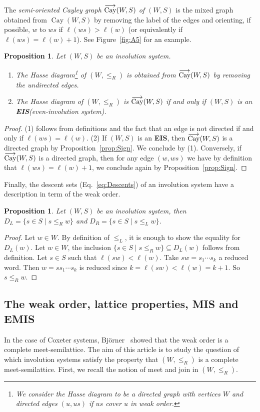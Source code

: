 \documentclass[A4paper, oneside]{amsart}
\newcommand{\Cay}{\operatorname{Cay}}
\newcommand{\oCay}{%
  \operatorname{%
    \overset{\smash{\raisebox{-0.45ex}{$\longrightarrow$}}}{\textnormal{Cay}}%
  }%
}
\newcommand{\EIS}{\textnormal{\bf EIS}\xspace}
\newcommand{\EMIS}{\textnormal{\bf EMIS}\xspace}
\newcommand{\MIS}{\textnormal{\bf MIS}\xspace}
\newtheorem{prop}[thm]{Proposition}
\theoremstyle{definition}
\begin{document}
\smallskip 
The {\em semi-oriented Cayley graph $\oCay(W,S)$ of $(W,S)$} is the mixed graph obtained from $\Cay(W,S)$ by removing the label of the edges and orienting, if possible, $w$ to $ws$ if $\ell(ws)>\ell(w)$ (or equivalently if $\ell(ws)=\ell(w)+ 1$). See Figure~\ref{fig:A5} for an example. 

\begin{prop}\label{prop:EIS} Let $(W,S)$ be an involution system.
\begin{enumerate}
\item The Hasse diagram\footnote{We consider the Hasse diagram to be a directed graph with vertices $W$ and directed edges $(u,us)$ if $us$ cover $u$ in weak order.} of $(W,\leq_R)$ is obtained from $\oCay(W,S)$ by removing the undirected edges.
\item The Hasse diagram of $(W,\leq_R)$ is $\oCay(W,S)$ if and only if $(W,S)$ is an \EIS (even-involution system).
\end{enumerate}
\end{prop}
\begin{proof}  (1) follows from definitions and the fact that an edge is not directed if and only if $\ell(ws)=\ell(w)$. (2) If $(W,S)$ is an \EIS, then $\oCay(W,S)$ is a directed graph by Proposition~\ref{prop:Sign}. We conclude by (1). Conversely, if $\oCay(W,S)$ is a directed graph, then for any edge $(w,ws)$ we have by definition that $\ell(ws)=\ell(w)+1$, we conclude again by Proposition~\ref{prop:Sign}.
\end{proof}

Finally, the descent sets (Eq.~\eqref{eq:Descents}) of an involution system have a description in term of the weak order.

\begin{prop}
\label{prop:Descents}
 Let $(W,S)$ be an involution system, then $D_L=\{s\in S\mid s\leq_R w\}$ and $D_R=\{s\in S\mid s\leq_L w\}$.
 \end{prop}
 \begin{proof} Let $w\in W$. By definition of $\leq_L$, it is enough to show the equality for $D_L(w)$. Let $w\in W$, the inclusion $\{s\in S\mid s\leq_R w\}\subseteq D_L(w)$ follows from definition. Let $s\in S$ such that $\ell(sw)<\ell(w)$. Take $sw=s_1\cdots s_k$ a reduced word. Then $w=ss_1\cdots s_k$ is reduced since $k=\ell(sw)<\ell(w)=k+1$. So $s\leq_R w$.  
 \end{proof}


\subsection{The weak order, lattice properties, \MIS and \EMIS}  In the case of Coxeter systems, Bj\"orner~\cite{Bj84,BjBr05}  showed that the weak order is a complete meet-semilattice.  The aim of this article is to study the question of which involution systems satisfy the property that $(W,\leq_R)$ is a complete meet-semilattice. First, we recall the notion of meet and join in $(W,\leq_R)$.  
\end{document}
